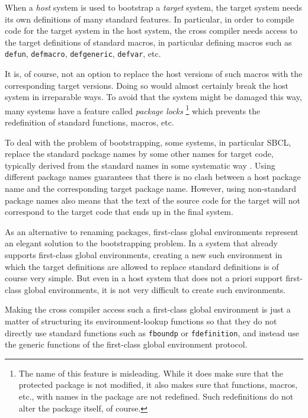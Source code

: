 When a \emph{host} \commonlisp{} system is used to bootstrap a
\emph{target} \commonlisp{} system, the target system needs its own
definitions of many standard \commonlisp{} features.  In particular,
in order to compile code for the target system in the host system, the
cross compiler needs access to the target definitions of standard
\commonlisp{} macros, in particular defining macros such as
\texttt{defun}, \texttt{defmacro}, \texttt{defgeneric},
\texttt{defvar}, etc.

It is, of course, not an option to replace the host versions of such
macros with the corresponding target versions.  Doing so would almost
certainly break the host system in irreparable ways.  To avoid that
the system might be damaged this way,
many \commonlisp{} systems have a feature called \emph{package locks}%
\footnote{The name of this feature is misleading.  While it does make
  sure that the protected package is not modified, it also makes sure
  that functions, macros, etc., with names in the package are not
  redefined.  Such redefinitions do not alter the package itself, of
  course.}
which prevents the redefinition of standard \commonlisp{} functions,
macros, etc.

To deal with the problem of bootstrapping, some systems, in particular
SBCL, replace the standard package names by some other names for
target code, typically derived from the standard names in some
systematic way \cite{Rhodes:2008:SSC:1482373.1482380}.  Using
different package names guarantees that there is no clash between a
host package name and the corresponding target package name.  However,
using non-standard package names also means that the text of the
source code for the target will not correspond to the target code that
ends up in the final system.

As an alternative to renaming packages, first-class global
environments represent an elegant solution to the bootstrapping
problem.  In a system that already supports first-class global
environments, creating a new such environment in which the target
definitions are allowed to replace standard \commonlisp{} definitions
is of course very simple.  But even in a host system that does not a
priori support first-class global environments, it is not very
difficult to create such environments.

Making the cross compiler access such a first-class global environment
is just a matter of structuring its environment-lookup functions so
that they do not directly use standard \commonlisp{} functions such as
\texttt{fboundp} or \texttt{fdefinition}, and instead use the generic
functions of the first-class global environment protocol.

